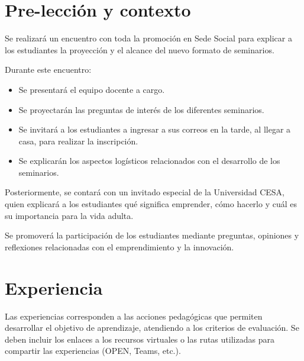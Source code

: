 \documentclass[12pt,a4paper]{article}
\begin{document}
	
	\section{Pre-lección y contexto}
	
	Se realizará un encuentro con toda la promoción en Sede Social para
	explicar a los estudiantes la proyección y el alcance del nuevo
	formato de seminarios.
	
	Durante este encuentro:
	
	\begin{itemize}
		
		\item Se presentará el equipo docente a cargo.
		
		\item Se proyectarán las preguntas de interés de los diferentes
		seminarios.
		
		\item Se invitará a los estudiantes a ingresar a sus correos en
		la tarde, al llegar a casa, para realizar la inscripción.
		
		\item Se explicarán los aspectos logísticos relacionados con el
		desarrollo de los seminarios.
		
	\end{itemize}
	
	Posteriormente, se contará con un invitado especial de la Universidad
	CESA, quien explicará a los estudiantes qué significa emprender, cómo
	hacerlo y cuál es su importancia para la vida adulta.
	
	Se promoverá la participación de los estudiantes mediante preguntas,
	opiniones y reflexiones relacionadas con el emprendimiento y la
	innovación.
	
	
	\section{Experiencia}
	
	Las experiencias corresponden a las acciones pedagógicas que permiten
	desarrollar el objetivo de aprendizaje, atendiendo a los criterios de
	evaluación. Se deben incluir los enlaces a los recursos virtuales o
	las rutas utilizadas para compartir las experiencias (OPEN, Teams,
	etc.).
	
\end{document}

